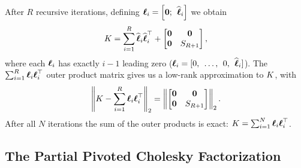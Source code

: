%
After $R$ recursive iterations, defining $\boldsymbol{\ell}_{i} = \left[ \mathbf{0}; \:\: \widehat {\boldsymbol{\ell}}_i \right]$ we obtain
%
\begin{align}
  K  = \sum_{i=1}^{R} \widehat {\boldsymbol{\ell}}_{i} \widehat {\boldsymbol{\ell}}_{i}^{\top} + \begin{bmatrix} \mathbf{0} & \mathbf{0} \\ \mathbf{0} & S_{R+1} \end{bmatrix},
  \label{eqn:chol_low_rank}
\end{align}
%
where each $\boldsymbol{\ell}_i$ has exactly $i-1$ leading zero ($\boldsymbol{\ell}_i = [0, \:\: \ldots, \:\: 0, \:\: \widehat {\boldsymbol{\ell}}_i]$).
The $\sum_{i=1}^R \boldsymbol{\ell}_i \boldsymbol{\ell}_i^\top$ outer product matrix gives us a low-rank approximation to $K$, with
\begin{equation}
  \left\Vert K - \sum_{i=1}^{R}{\boldsymbol{\ell}}_{i}{\boldsymbol{\ell}}_{i}^{\top} \right\Vert_{2} = \left\Vert \begin{bmatrix} \mathbf{0} & \mathbf{0} \\ \mathbf{0} & S_{R+1} \end{bmatrix} \right\Vert_2.
  \label{eqn:chol_low_rank}
\end{equation}
After all $N$ iterations the sum of the outer products is exact: $K = \sum_{i=1}^N \boldsymbol{\ell}_i \boldsymbol{\ell}_i^\top$.


\subsection{The Partial Pivoted Cholesky Factorization}
\label{sec:piv_chol}

